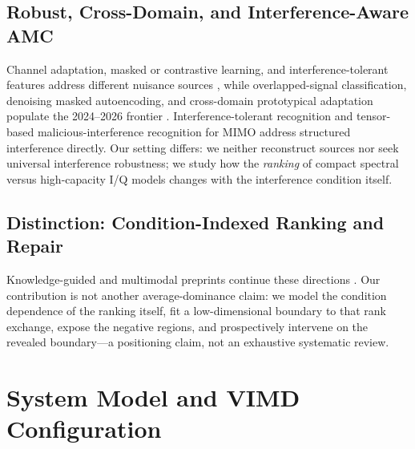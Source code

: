 \documentclass[letterpaper,journal]{IEEEtran}
\begin{document}
\subsection{Robust, Cross-Domain, and Interference-Aware AMC}
Channel adaptation, masked or contrastive learning, and interference-tolerant
features address different nuisance sources
\cite{wang2024sigda,xiao2024mclhn,du2025contrastive,sun2025mfenet}, while
overlapped-signal classification, denoising masked autoencoding, and
cross-domain prototypical adaptation populate the 2024--2026 frontier
\cite{jajoo2024overlapped,faysal2026denomae,li2026cgpcda}. Interference-tolerant
recognition \cite{sun2025mfenet} and tensor-based malicious-interference
recognition for MIMO \cite{zhang2026malicious} address structured interference
directly. Our setting differs: we neither reconstruct sources nor seek universal
interference robustness; we study how the \emph{ranking} of compact spectral versus
high-capacity I/Q models changes with the interference condition itself.

\subsection{Distinction: Condition-Indexed Ranking and Repair}
Knowledge-guided and multimodal preprints continue these directions
\cite{dkdnet2026preprint,moeformer2026preprint,zoomspec2026preprint,
rismae2025preprint}. Our contribution is not another average-dominance claim:
we model the condition dependence of the ranking itself, fit a
low-dimensional boundary to that rank exchange, expose the negative regions,
and prospectively intervene on the revealed boundary---a positioning claim,
not an exhaustive systematic review.

\section{System Model and VIMD Configuration}
\end{document}
